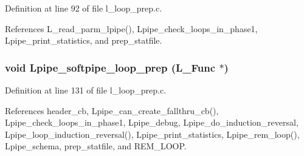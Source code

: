 Definition at line 92 of file l\_\-loop\_\-prep.c.

References L\_\-read\_\-parm\_\-lpipe(), Lpipe\_\-check\_\-loops\_\-in\_\-phase1, Lpipe\_\-print\_\-statistics, and prep\_\-statfile.
\subsubsection{\setlength{\rightskip}{0pt plus 5cm}void Lpipe\_\-softpipe\_\-loop\_\-prep (L\_\-Func $\ast$)}\label{l__loop__prep_8h_52ada762dc510133a69facd93899b1c9}




Definition at line 131 of file l\_\-loop\_\-prep.c.

References header\_\-cb, Lpipe\_\-can\_\-create\_\-fallthru\_\-cb(), Lpipe\_\-check\_\-loops\_\-in\_\-phase1, Lpipe\_\-debug, Lpipe\_\-do\_\-induction\_\-reversal, Lpipe\_\-loop\_\-induction\_\-reversal(), Lpipe\_\-print\_\-statistics, Lpipe\_\-rem\_\-loop(), Lpipe\_\-schema, prep\_\-statfile, and REM\_\-LOOP.